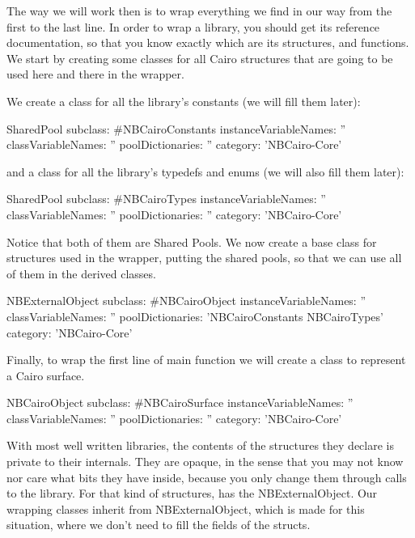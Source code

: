 \documentclass[a4paper,10pt,twoside]{book}
\begin{document}
The way we will work then is to wrap everything we find in
our way from the first to the last line. In order to wrap a
library, you should get its reference documentation, so that
you know exactly which are its structures, and functions.
We start by creating some classes for all Cairo structures
that are going to be used here and there in the wrapper.

We create a class for all the library's constants (we will
fill them later):

\begin{classdef}{}
SharedPool subclass: #NBCairoConstants
	instanceVariableNames: ''
	classVariableNames: ''
	poolDictionaries: ''
	category: 'NBCairo-Core'
\end{classdef}

and a class for all the library's typedefs and enums (we will
also fill them later):

\begin{classdef}{}
SharedPool subclass: #NBCairoTypes
	instanceVariableNames: ''
	classVariableNames: ''
	poolDictionaries: ''
	category: 'NBCairo-Core'
\end{classdef}

Notice that both of them are Shared Pools. We now create a base
class for structures used in the wrapper, putting the shared pools,
so that we can use all of them in the derived classes. 

\begin{classdef}{}
NBExternalObject subclass: #NBCairoObject
	instanceVariableNames: ''
	classVariableNames: ''
	poolDictionaries: 'NBCairoConstants NBCairoTypes'
	category: 'NBCairo-Core'
\end{classdef}

Finally, to wrap the first line of main function we will create a
class to represent a Cairo surface.

\begin{classdef}{}
NBCairoObject subclass: #NBCairoSurface
	instanceVariableNames: ''
	classVariableNames: ''
	poolDictionaries: ''
	category: 'NBCairo-Core'
\end{classdef}

With most well written libraries, the contents of the structures
they declare is private to their internals. They are opaque, in the
sense that you may not know nor care what bits they have inside,
because you only change them through calls to the library.
For that kind of structures, \NativeBoost has the NBExternalObject.
Our wrapping classes inherit from NBExternalObject, which is
made for this situation, where we don't need to fill the fields
of the structs.
\end{document}
